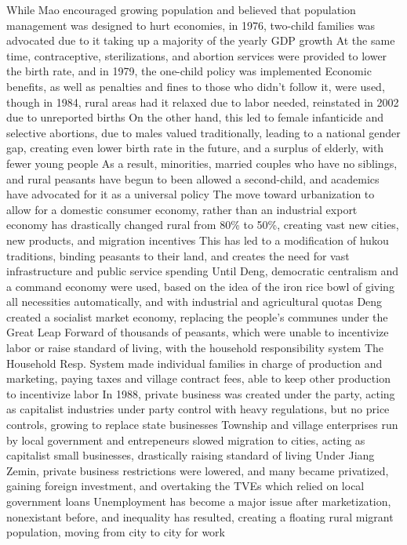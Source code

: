 \documentclass[11 pt, twoside]{article}
\newenvironment{outline*}
{
	\begin{outline}[enumerate]
	}
	{\end{outline}
}
\begin{document}
\begin{outline*}
\1 While Mao encouraged growing population and believed that population management was designed to hurt economies, in 1976, two-child families was advocated due to it taking up a majority of the yearly GDP growth
\2 At the same time, contraceptive, sterilizations, and abortion services were provided to lower the birth rate, and in 1979, the one-child policy was implemented
\3 Economic benefits, as well as penalties and fines to those who didn't follow it, were used, though in 1984, rural areas had it relaxed due to labor needed, reinstated in 2002 due to unreported births
\3 On the other hand, this led to female infanticide and selective abortions, due to males valued traditionally, leading to a national gender gap, creating even lower birth rate in the future, and a surplus of elderly, with fewer young people
\3 As a result, minorities, married couples who have no siblings, and rural peasants have begun to been allowed a second-child, and academics have advocated for it as a universal policy
\2 The move toward urbanization to allow for a domestic consumer economy, rather than an industrial export economy has drastically changed rural from 80\% to 50\%, creating vast new cities, new products, and migration incentives
\3 This has led to a modification of hukou traditions, binding peasants to their land, and creates the need for vast infrastructure and public service spending
\1 Until Deng, democratic centralism and a command economy were used, based on the idea of the iron rice bowl of giving all necessities automatically, and with industrial and agricultural quotas
\2 Deng created a socialist market economy, replacing the people's communes under the Great Leap Forward of thousands of peasants, which were unable to incentivize labor or raise standard of living, with the household responsibility system
\3 The Household Resp. System made individual families in charge of production and marketing, paying taxes and village contract fees, able to keep other production to incentivize labor
\2 In 1988, private business was created under the party, acting as capitalist industries under party control with heavy regulations, but no price controls, growing to replace state businesses
\3 Township and village enterprises run by local government and entrepeneurs slowed migration to cities, acting as capitalist small businesses, drastically raising standard of living
\3 Under Jiang Zemin, private business restrictions were lowered, and many became privatized, gaining foreign investment, and overtaking the TVEs which relied on local government loans
\2 Unemployment has become a major issue after marketization, nonexistant before, and inequality has resulted, creating a floating rural migrant population, moving from city to city for work

\end{outline*}
\end{document}
